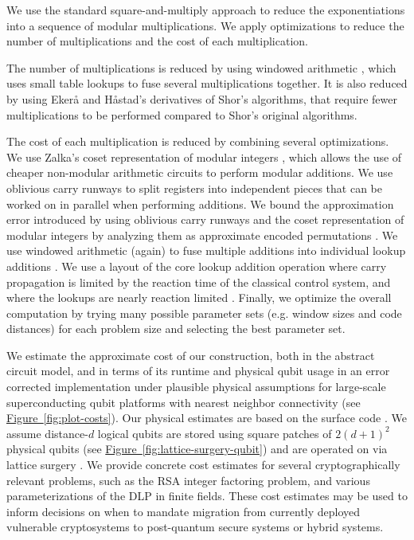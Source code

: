 \documentclass[a4paper, onecolumn, accepted=2021-03-29]{quantumarticle}
\newcommand{\fig}[1]{\hyperref[fig:#1]{Figure~\ref*{fig:#1}}}
\begin{document}
We use the standard square-and-multiply approach to reduce the exponentiations into a sequence of modular multiplications.
We apply optimizations to reduce the number of multiplications and the cost of each multiplication.

The number of multiplications is reduced by using windowed arithmetic \cite{van2005fastexponentiation,kutin2006shor,gidney2019windowedarithmetic}, which uses small table lookups to fuse several multiplications together.
It is also reduced by using Ekerå and Håstad's derivatives \cite{ekeraa2016modifying, ekeraa2017quantum, ekeraa2017pp, ekeraa2018general} of Shor's algorithms, that require fewer multiplications to be performed  compared to Shor's original algorithms.

The cost of each multiplication is reduced by combining several optimizations.
We use Zalka's coset representation of modular integers \cite{zalka2006pure}, which allows the use of cheaper non-modular arithmetic circuits to perform modular additions.
We use oblivious carry runways \cite{gidney2019approximatepermutation} to split registers into independent pieces that can be worked on in parallel when performing additions.
We bound the approximation error introduced by using oblivious carry runways and the coset representation of modular integers by analyzing them as approximate encoded permutations \cite{gidney2019approximatepermutation}.
We use windowed arithmetic (again) to fuse multiple additions into individual lookup additions \cite{gidney2019windowedarithmetic}.
We use a layout of the core lookup addition operation where carry propagation is limited by the reaction time of the classical control system, and where the lookups are nearly reaction limited \cite{gidney2019autoccz}.
Finally, we optimize the overall computation by trying many possible parameter sets (e.g. window sizes and code distances) for each problem size and selecting the best parameter set.

We estimate the approximate cost of our construction, both in the abstract circuit model, and in terms of its runtime and physical qubit usage in an error corrected implementation under plausible physical assumptions for large-scale superconducting qubit platforms with nearest neighbor connectivity (see \fig{plot-costs}).
Our physical estimates are based on the surface code \cite{fowler2012surfacecodereview}.
We assume distance-$d$ logical qubits are stored using square patches of $2(d+1)^2$ physical qubits (see \fig{lattice-surgery-qubit}) and are operated on via lattice surgery \cite{horsman2012latticesurgery,fowler2018}.
We provide concrete cost estimates for several cryptographically relevant problems, such as the RSA integer factoring problem, and various parameterizations of the DLP in finite fields.
These cost estimates may be used to inform decisions on when to mandate migration from currently deployed vulnerable cryptosystems to post-quantum secure systems or hybrid systems.
\end{document}
